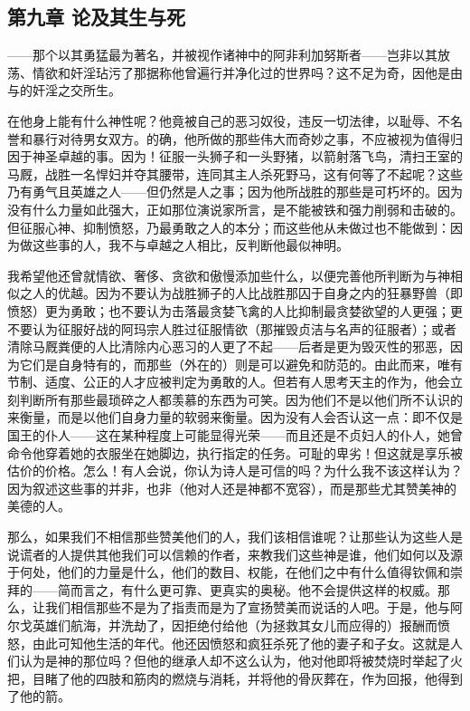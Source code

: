 \subsection{第九章  论及其生与死}

——那个以其勇猛最为著名，并被视作诸神中的阿非利加努斯者——岂非以其放荡、情欲和奸淫玷污了那据称他曾遍行并净化过的世界吗？这不足为奇，因他是由与的奸淫之交所生。\par

在他身上能有什么神性呢？他竟被自己的恶习奴役，违反一切法律，以耻辱、不名誉和暴行对待男女双方。的确，他所做的那些伟大而奇妙之事，不应被视为值得归因于神圣卓越的事。因为！征服一头狮子和一头野猪，以箭射落飞鸟，清扫王室的马厩，战胜一名悍妇并夺其腰带，连同其主人杀死野马，这有何等了不起呢？这些乃有勇气且英雄之人——但仍然是人之事；因为他所战胜的那些是可朽坏的。因为没有什么力量如此强大，正如那位演说家所言，是不能被铁和强力削弱和击破的。但征服心神、抑制愤怒，乃最勇敢之人的本分；而这些他从未做过也不能做到：因为做这些事的人，我不与卓越之人相比，反判断他最似神明。\par

我希望他还曾就情欲、奢侈、贪欲和傲慢添加些什么，以便完善他所判断为与神相似之人的优越。因为不要认为战胜狮子的人比战胜那囚于自身之内的狂暴野兽（即愤怒）更为勇敢；也不要认为击落最贪婪飞禽的人比抑制最贪婪欲望的人更强；更不要认为征服好战的阿玛宗人胜过征服情欲（那摧毁贞洁与名声的征服者）；或者清除马厩粪便的人比清除内心恶习的人更了不起——后者是更为毁灭性的邪恶，因为它们是自身特有的，而那些（外在的）则是可以避免和防范的。由此而来，唯有节制、适度、公正的人才应被判定为勇敢的人。但若有人思考天主的作为，他会立刻判断所有那些最琐碎之人都羡慕的东西为可笑。因为他们不是以他们所不认识的来衡量，而是以他们自身力量的软弱来衡量。因为没有人会否认这一点：即不仅是国王的仆人——这在某种程度上可能显得光荣——而且还是不贞妇人的仆人，她曾命令他穿着她的衣服坐在她脚边，执行指定的任务。可耻的卑劣！但这就是享乐被估价的价格。怎么！有人会说，你认为诗人是可信的吗？为什么我不该这样认为？因为叙述这些事的并非，也非（他对人还是神都不宽容），而是那些尤其赞美神的美德的人。\par

那么，如果我们不相信那些赞美他们的人，我们该相信谁呢？让那些认为这些人是说谎者的人提供其他我们可以信赖的作者，来教我们这些神是谁，他们如何以及源于何处，他们的力量是什么，他们的数目、权能，在他们之中有什么值得钦佩和崇拜的——简而言之，有什么更可靠、更真实的奥秘。他不会提供这样的权威。那么，让我们相信那些不是为了指责而是为了宣扬赞美而说话的人吧。于是，他与阿尔戈英雄们航海，并洗劫了，因拒绝付给他（为拯救其女儿而应得的）报酬而愤怒，由此可知他生活的年代。他还因愤怒和疯狂杀死了他的妻子和子女。这就是人们认为是神的那位吗？但他的继承人却不这么认为，他对他即将被焚烧时举起了火把，目睹了他的四肢和筋肉的燃烧与消耗，并将他的骨灰葬在，作为回报，他得到了他的箭。\par

